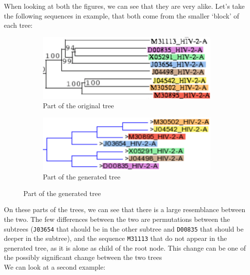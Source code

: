 \documentclass[english,13pt,a4paper]{article}
\theoremstyle{definition}
\theoremstyle{remark}
\theoremstyle{defstyle}
\begin{document}
When looking at both the figures, we can see that they are very alike. Let's take the following sequences in example, that both come from the smaller `block' of each tree:

\begin{figure}[H]
    \centering
    \begin{subfigure}{.48\textwidth}
        \centering
        \includegraphics[width=\textwidth]{Images/Example2_Orig66.png}
        \caption{Part of the original tree}
    \end{subfigure}
    \hfill
    \begin{subfigure}{.48\textwidth}
        \centering
        \includegraphics[width=\textwidth]{Images/Example2_66.png}
        \caption{Part of the generated tree}
    \end{subfigure}
\end{figure}

On these parts of the trees, we can see that there is a large resemblance between the two. The few differences between the two are permutations between the subtrees (\texttt{J03654} that should be in the other subtree and \texttt{D00835} that should be deeper in the subtree), and the sequence \texttt{M31113} that do not appear in the generated tree, as it is alone as child of the root node. This change can be one of the possibly significant change between the two trees\\

We can look at a second example:
\end{document}
